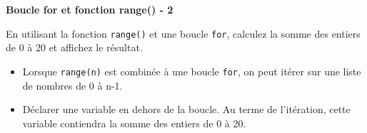     \begin{Exercice}[5 minutes] \textbf{Boucle for et fonction range() - 2}
      	
      	En utilisant la fonction \lstinline{range()} et une boucle \lstinline{for}, calculez la somme des entiers de 0 à 20 et affichez le résultat.
    
        \begin{conseil}
           \begin{itemize}
           	\item Lorsque \lstinline{range(n)} est combinée à une boucle \lstinline{for}, on peut itérer sur une liste de nombres de 0 à n-1.
           	\item Déclarer une variable en dehors de la boucle. Au terme de l'itération, cette variable contiendra la somme des entiers de 0 à 20.
           \end{itemize}
		     
        \end{conseil}
        
        \begin{solution}
            
        \end{solution}
    \end{Exercice}

    \begin{comment}
    
    \begin{Exercice}[10 minutes] \textbf{Création d'une liste à partir d'un tuple}
      	
      	Transformer le tuple (1,4,5,8) en une liste à l'aide d'une boucle \lstinline{for}.
    
        \begin{conseil}
           \begin{itemize}
           	\item Déclarer une liste vide à l'extérieur de la boucle.
           	\item La boucle permet d'itérer sur le tuple.
           	\item Rajouter un à un les éléments du tuple dans la liste.
           \end{itemize}
		     
        \end{conseil}
        
        \begin{solution}
            
        \end{solution}
    \end{Exercice}

\end{comment}
    
